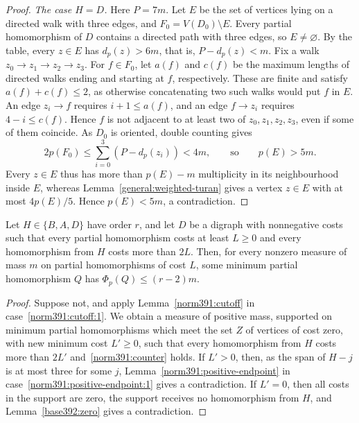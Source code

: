 \begin{proof}
\emph{The case $H=D$.} Here $P=7m$. Let $E$ be the set of vertices
lying on a directed walk with three edges, and $F_0=V(D_0)\setminus E$.
Every partial homomorphism of $D$ contains a directed path with three edges, so $E\ne\varnothing$.
By the table, every $z\in E$ has $d_p(z)>6m$, that is, $P-d_p(z)<m$. Fix a walk $z_0\to z_1\to z_2\to z_3$.
For $f\in F_0$, let $a(f)$ and $c(f)$ be the maximum lengths of directed walks
ending and starting at $f$, respectively. These are finite and satisfy
$a(f)+c(f)\le2$, as otherwise concatenating two such walks would put $f$ in $E$.
An edge $z_i\to f$ requires $i+1\le a(f)$, and an edge
$f\to z_i$ requires $4-i\le c(f)$. Hence $f$ is not adjacent
to at least two of $z_0,z_1,z_2,z_3$, even if some of them coincide. As $D_0$ is oriented, double counting gives
\[
 2p(F_0)\le\sum_{i=0}^3(P-d_p(z_i))<4m,
 \qquad\text{so}\qquad p(E)>5m.
\]
Every $z\in E$ thus has more than $p(E)-m$ multiplicity in its neighbourhood inside $E$, whereas
Lemma~\ref{general:weighted-turan} gives a vertex $z\in E$ with at most $4p(E)/5$. Hence
$p(E)<5m$, a contradiction.
\end{proof}

\begin{lemma}
\label{base392:endpoint}
\label{b:endpoint}\label{a:endpoint}\label{repair:d53-endpoint}
Let $H\in\{B,A,D\}$ have order $r$, and let $D$ be a digraph with nonnegative costs such that every partial homomorphism costs at least $L\ge0$ and every
homomorphism from $H$ costs more than $2L$.
Then, for every nonzero measure of mass $m$ on partial homomorphisms of cost $L$, some
minimum partial homomorphism $Q$ has $\Phi_p(Q)\le(r-2)m$.
\end{lemma}
\begin{proof}
Suppose not, and apply Lemma~\ref{norm391:cutoff} in case~\ref{norm391:cutoff:1}. We obtain a measure of positive mass, supported on minimum partial homomorphisms which meet the set $Z$ of vertices of cost zero, with new minimum cost $L'\ge0$, such that every homomorphism from $H$ costs more than $2L'$ and~\eqref{norm391:counter} holds.
If $L'>0$, then, as the span of $H-j$ is at most three for some $j$, Lemma~\ref{norm391:positive-endpoint} in case~\ref{norm391:positive-endpoint:1} gives a contradiction.
If $L'=0$, then all costs in the support are zero, the support receives no homomorphism from $H$, and Lemma~\ref{base392:zero} gives a contradiction.
\end{proof}

